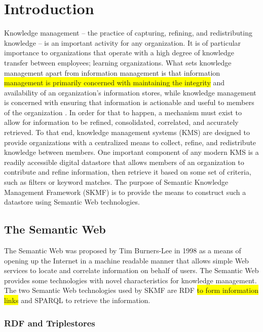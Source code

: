 \chapter{Introduction}
\label{intro}

Knowledge management -- the practice of capturing, refining, and redistributing knowledge -- is an important activity for any organization. It is of particular importance to organizations that operate with a high degree of knowledge transfer between employees; learning organizations. What sets knowledge management apart from information management is that information
\colorbox{yellow}{management is primarily concerned with maintaining the integrity}
and availability of an organization's information stores, while knowledge management is concerned with ensuring that information is actionable and useful to members of the organization
\cite{kmtoolkit}.
In order for that to happen, a mechanism must exist to allow for information to be refined, consolidated, correlated, and accurately retrieved. To that end, knowledge management systems (KMS) are designed to provide organizations with a centralized means to collect, refine, and redistribute knowledge between members. One important component of any modern KMS is a readily accessible digital datastore that allows members of an organization to contribute and refine information, then retrieve it based on some set of criteria, such as filters or keyword matches. The purpose of Semantic Knowledge Management Framework (SKMF) is to provide the means to construct such a datastore using Semantic Web technologies.


\section{The Semantic Web}
\label{intro:semantic}

The Semantic Web was proposed by Tim Burners-Lee in 1998
\cite{bernerslee}
as a means of opening up the Internet in a machine readable manner that allows simple Web services to locate and correlate information on behalf of users. The Semantic Web provides some technologies with novel characteristics for knowledge management. The two Semantic Web technologies used by SKMF are RDF
\colorbox{yellow}{to form information links}
and SPARQL
\cite{sparql}
to retrieve the information.


\subsection{RDF and Triplestores}
\label{intro:rdf}

